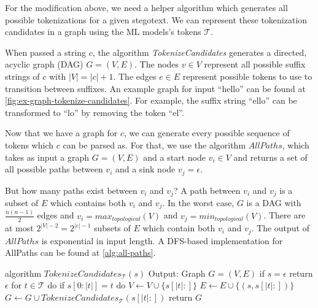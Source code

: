 For the modification above, we need a helper algorithm which generates all possible tokenizations for a given stegotext.
We can represent these tokenization candidates in a graph using the ML models's tokens $\mathcal{T}$.

When passed a string $c$, the algorithm \emph{TokenizeCandidates} generates a directed, acyclic graph (DAG) $G = (V, E)$.
The nodes $v \in V$ represent all possible suffix strings of $c$ with $|V| = |c| + 1$.
The edges $e \in E$ represent possible tokens to use to transition between suffixes.
An example graph for input ``hello'' can be found at \ref{fig:ex-graph-tokenize-candidates}.
For example, the suffix string ``ello'' can be transformed to ``lo'' by removing the token ``el''.

Now that we have a graph for $c$, we can generate every possible sequence of tokens which $c$ can be parsed as.
For that, we use the algorithm $AllPaths$, which takes as input a graph $G = (V, E)$ and a start node $v_i \in V$ and returns a set of all possible paths between $v_i$ and a sink node $v_j = \epsilon$.

But how many paths exist between $v_i$ and $v_j$? A path between $v_i$ and $v_j$ is a subset of $E$ which contains both $v_i$ and $v_j$.
In the worst case, $G$ is a DAG with $\frac{n(n-1)}{2}$ edges and $v_i = max_{topological}(V)$ and $v_j = min_{topological}(V)$.
There are at most $2^{|V|-2} = 2^{|c|-1}$ subsets of $E$ which contain both $v_i$ and $v_j$.
The output of $AllPaths$ is exponential in input length.
A DFS-based implementation for AllPaths can be found at \autoref{alg:all-paths}.

\begin{Pseudocode}[float,caption={TokenizeCandidates algorithm},label={alg:tokenize-candidates}]
	algorithm $TokenizeCandidates_{\mathcal{T}}(s)$
		Output: Graph $G = (V, E)$
		if $s = \epsilon$
			return $\epsilon$
		for $t \in \mathcal{T}$ do
			if $s[0{:}|t|] = t$ do
				$V \leftarrow V \cup \{ s[|t|{:}] \}$
				$E \leftarrow E \cup \{ (s, s[|t|{:}]) \}$
				$G \leftarrow G \cup TokenizeCandidates_{\mathcal{T}}(s[|t|{:}])$
		return $G$
\end{Pseudocode}

